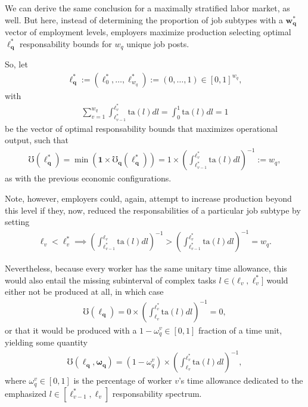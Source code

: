 \documentclass[hidelinks, nonatbib]{elsarticle}
\begin{document}
We can derive the same conclusion for a maximally stratified labor market, as well. But here, instead of determining the proportion of job subtypes with a $\boldsymbol{w_{q}^{*}}$ vector of employment levels, employers maximize production selecting optimal $\boldsymbol{\ell_{q}^{*}}$ responsability bounds for $w_q$ unique job posts.

So, let 
\begin{gather}
    \boldsymbol{\ell_{q}^{*}}
    :=
    (\ell_{0}^{*}, \dots, \ell_{w_q}^{*})
    :=
    (0, \dots, 1) 
    \in [0,1]^{w_q}
    ,
\end{gather}
with
\begin{gather}
\sum_{v=1}^{w_q}
\int_{
    \ell_{v-1}^{*}
}^{
    \ell_{v}^{*}
}
\text{ta}(l)dl
=
\int_{0}^{1}
\text{ta}(l)dl
=
1
\end{gather}
be the vector of optimal responsability bounds that maximizes operational output, such that
\begin{gather}
    \mho(\boldsymbol{\ell_{q}^{*}})
    =
    \min(
        \boldsymbol{1}
        \times
        \boldsymbol{\mho_q}(
            \boldsymbol{\ell_{q}^{*}}
        )
    )
    =
    1
    \times
    \left(
        \int_{
            \ell_{v-1}^{*}
        }^{
            \ell_{v}^{*}
        }
        \text{ta}(l)dl
    \right) ^ {-1}
    :=
    w_q
    ,
\end{gather}
as with the previous economic configurations.

Note, however, employers could, again, attempt to increase production beyond this level if they, now, reduced the responsabilities of a particular job subtype by setting
\begin{align}
\ell_v < \ell_{v}^{*}
\implies
    \left(
        \int_{
            \ell_{v-1}^{*}
        }^{
            \ell_{v}
        }
        \text{ta}(l)dl
    \right) ^ {-1}
    >
    \left(
        \int_{
            \ell_{v-1}^{*}
        }^{
            \ell_{v}^{*}
        }
        \text{ta}(l)dl
    \right) ^ {-1}
    =
    w_q
    .
\end{align}

Nevertheless, because every worker has the same unitary time allowance, this would also entail the missing subinterval of complex tasks $l \in (\ell_{v}, \ell_{v}^{*}]$ would either not be produced at all, in which case
\begin{align}
    \mho(\boldsymbol{\ell_{q}})
    =
    0
    \times
    \left(
        \int_{
            \ell_{v}
        }^{
            \ell_{v}^{*}
        }
        \text{ta}(l)dl
    \right) ^ {-1}
    =
    0
    ,
\end{align}
or that it would be produced with a $1 - \omega_{q}^{v} \in [0,1]$ fraction of a time unit, yielding some quantity
\begin{align}
    \mho(
        \boldsymbol{\ell_{q}}
        ,\boldsymbol{\omega_{q}}
    )
    =
    (1 - \omega_{q}^{v})
    \times
    \left(
        \int_{
            \ell_{v}
        }^{
            \ell_{v}^{*}
        }
        \text{ta}(l)dl
    \right) ^ {-1}
    ,
\end{align}
where $\omega_{q}^{v} \in [0,1]$ is the percentage of worker $v$'s time allowance dedicated to the emphasized $l \in [\ell_{v-1}^{*}, \ell_{v}]$ responsability spectrum.
\end{document}
